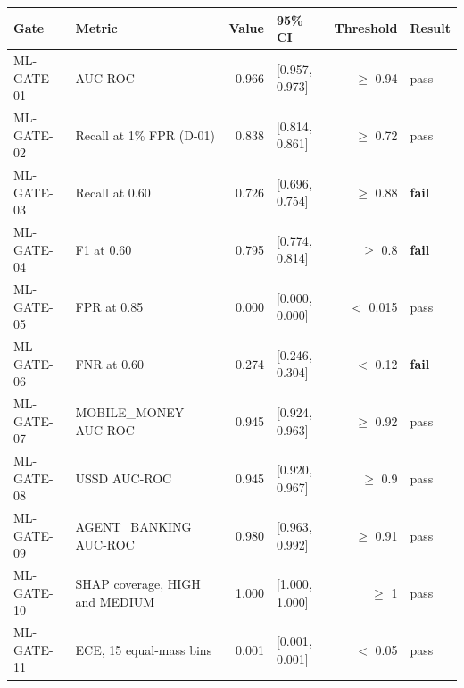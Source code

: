 \begin{tabular}{llrlrl}
\toprule
Gate & Metric & Value & 95\% CI & Threshold & Result \\
\midrule
ML-GATE-01 & AUC-ROC & 0.966 & [0.957, 0.973] & $\geq$ 0.94 & pass \\
ML-GATE-02 & Recall at 1\% FPR (D-01) & 0.838 & [0.814, 0.861] & $\geq$ 0.72 & pass \\
ML-GATE-03 & Recall at 0.60 & 0.726 & [0.696, 0.754] & $\geq$ 0.88 & \textbf{fail} \\
ML-GATE-04 & F1 at 0.60 & 0.795 & [0.774, 0.814] & $\geq$ 0.8 & \textbf{fail} \\
ML-GATE-05 & FPR at 0.85 & 0.000 & [0.000, 0.000] & $<$ 0.015 & pass \\
ML-GATE-06 & FNR at 0.60 & 0.274 & [0.246, 0.304] & $<$ 0.12 & \textbf{fail} \\
ML-GATE-07 & MOBILE_MONEY AUC-ROC & 0.945 & [0.924, 0.963] & $\geq$ 0.92 & pass \\
ML-GATE-08 & USSD AUC-ROC & 0.945 & [0.920, 0.967] & $\geq$ 0.9 & pass \\
ML-GATE-09 & AGENT_BANKING AUC-ROC & 0.980 & [0.963, 0.992] & $\geq$ 0.91 & pass \\
ML-GATE-10 & SHAP coverage, HIGH and MEDIUM & 1.000 & [1.000, 1.000] & $\geq$ 1 & pass \\
ML-GATE-11 & ECE, 15 equal-mass bins & 0.001 & [0.001, 0.001] & $<$ 0.05 & pass \\
\bottomrule
\end{tabular}
